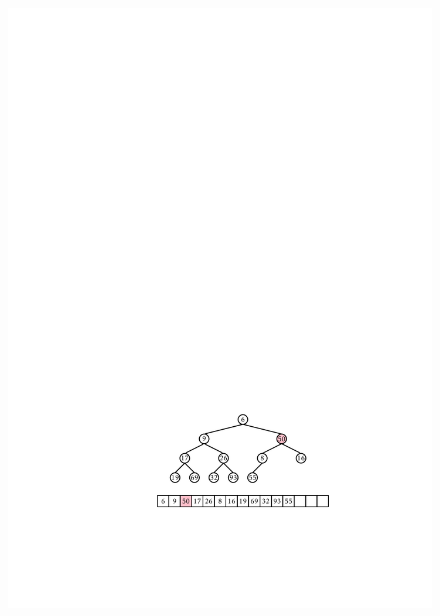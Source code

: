 \begin{figure}
\begin{center}
    \includegraphics[height=\QuarterHeightScaleIfNeeded]{figs/heap-remove-3} \\

\end{center}
\end{figure}
